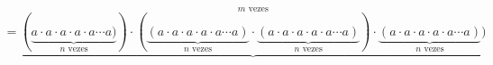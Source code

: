 \documentclass[preview]{standalone}
\begin{document}
\begin{align*}
=\underbrace{(\underbrace{a \cdot a \cdot a \cdot a \cdot a \cdots a)}_{n \text{ vezes}})\cdot(\underbrace{(a \cdot a \cdot a \cdot a \cdot a \cdots a)}_{n \text{ vezes}}\cdot\underbrace{(a \cdot a \cdot a \cdot a \cdot a \cdots a)}_{n \text{ vezes}})\cdot\underbrace{(a \cdot a \cdot a \cdot a \cdot a \cdots a)}_{n \text{ vezes}})}^{m \text{ vezes}}
\end{align*}
\end{document}
